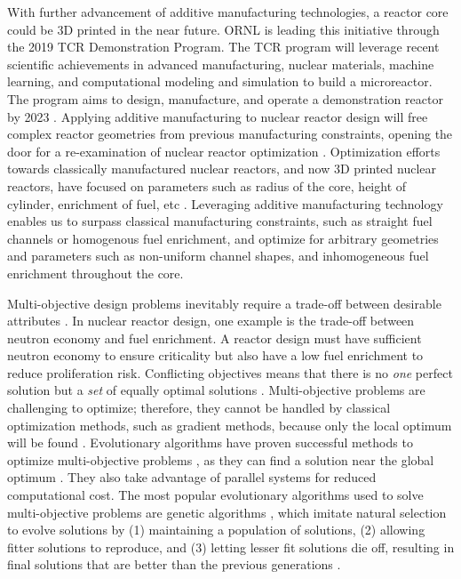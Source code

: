 With further advancement of additive manufacturing technologies, a reactor 
core could be 3D printed in the near future. 
\gls{ORNL} is leading this initiative through the 2019 \gls{TCR} Demonstration 
Program. 
The \gls{TCR} program will leverage recent scientific achievements in advanced 
manufacturing, nuclear materials, machine learning, and computational modeling 
and simulation to build a microreactor. 
The program aims to design, manufacture, and operate a demonstration reactor 
by 2023 \cite{terrani_transformational_2019}. 
Applying additive manufacturing to nuclear reactor design will free complex 
reactor geometries from previous manufacturing constraints,
opening the door for a re-examination of nuclear reactor optimization 
\cite{sobes_artificial_2020}. 
Optimization efforts towards classically manufactured nuclear reactors, and now
3D printed nuclear reactors, have focused on parameters such as radius of the 
core, height of cylinder, enrichment of fuel, etc 
\cite{sobes_artificial_2020,sacco_two_2006,kumar_new_2015,pereira_parallel_2008}. 
Leveraging additive manufacturing technology enables us to surpass classical 
manufacturing constraints, such as straight fuel channels or homogenous fuel 
enrichment, and optimize for arbitrary geometries and parameters 
such as non-uniform channel shapes, and inhomogeneous fuel enrichment throughout 
the core. 

Multi-objective design problems inevitably require a trade-off between 
desirable attributes \cite{byrne_evolving_2014,simon_sciences_2019}. 
In nuclear reactor design, one example is the trade-off between neutron economy 
and fuel enrichment.
A reactor design must have sufficient neutron economy to ensure criticality but 
also have a low fuel enrichment to reduce proliferation risk. 
Conflicting objectives means that there is no \textit{one} perfect solution but 
a \textit{set} of equally optimal solutions \cite{byrne_evolving_2014}.
Multi-objective problems are challenging to optimize; therefore, they cannot be 
handled by classical optimization methods, such as gradient methods, because only 
the local optimum will be found \cite{renner_genetic_2003}. 
Evolutionary algorithms have proven successful methods to optimize 
multi-objective problems \cite{krish_practical_2011}, as 
they can find a solution near the global optimum \cite{renner_genetic_2003}.
They also take advantage of parallel systems for reduced computational cost.
The most popular evolutionary algorithms used to solve multi-objective 
problems are genetic algorithms \cite{byrne_evolving_2014, krish_practical_2011},
which imitate natural selection to evolve solutions by (1) maintaining a 
population of solutions, (2) allowing fitter solutions to reproduce, and (3) 
letting lesser fit solutions die off, resulting in final solutions that are 
better than the previous generations \cite{renner_genetic_2003}. 

